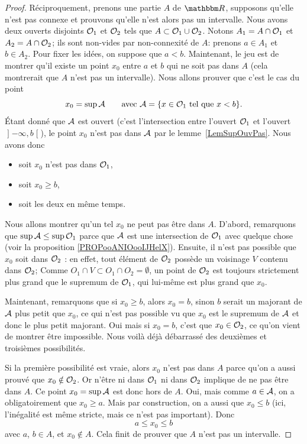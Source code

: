 \begin{proof}
    Réciproquement, prenons une partie $A$ de $\eR$, supposons qu'elle n'est pas connexe et prouvons qu'elle n'est alors pas un intervalle. Nous avons deux ouverts disjoints $\mathcal{O}_1$ et $\mathcal{O}_2$ tels que $A\subset \mathcal{O}_1\cup \mathcal{O}_2$. Notons \( A_1 = A \cap \mathcal{O}_1 \) et  \( A_2 = A \cap \mathcal{O}_2 \); ils sont non-vides par non-connexité de $A$: prenons $a\in A_1$ et $b\in A_2$. Pour fixer les idées, on suppose que $a<b$. Maintenant, le jeu est de montrer qu'il existe un point $x_0$ entre $a$ et $b$ qui ne soit pas dans $A$ (cela montrerait que $A$ n'est pas un intervalle). Nous allons prouver que c'est le cas du point
    \begin{equation}
      x_0=\sup \mathcal{A} \qquad \text{avec }\mathcal{A} = \{ x\in\mathcal{O}_1\text{ tel que } x<b \}.
    \end{equation}
    Étant donné que $\mathcal{A}$ est ouvert (c'est l'intersection entre l'ouvert $\mathcal{O}_1$ et l'ouvert $\mathopen] -\infty, b \mathclose[$), le point $x_0$ n'est pas dans $\mathcal{A}$ par le lemme~\ref{LemSupOuvPas}. Nous avons donc
    \begin{itemize}
        \item soit $x_0$ n'est pas dans $\mathcal{O}_1$,
        \item soit $x_0\geq b$,
        \item soit les deux en même temps.
    \end{itemize}
    Nous allons montrer qu'un tel $x_0$ ne peut pas être dans $A$. D'abord, remarquons que $\sup\mathcal{A}\leq\sup\mathcal{O}_1$ parce que $\mathcal{A}$ est une intersection de $\mathcal{O}_1$ avec quelque chose (voir la proposition \ref{PROPooANIOooIJHelX}). Ensuite, il n'est pas possible que $x_0$ soit dans $\mathcal{O}_2$ : en effet, tout élément de $\mathcal{O}_2$ possède un voisinage $V$ contenu dans $\mathcal{O}_2$; Comme $O_1 \cap V \subset O_1 \cap O_2 = \emptyset$, un point de $\mathcal{O}_2$ est toujours strictement plus grand que le supremum de $\mathcal{O}_1$, qui lui-même est plus grand que $x_0$.

    Maintenant, remarquons que si $x_0\geq b$, alors $x_0=b$, sinon $b$ serait un majorant de $\mathcal{A}$ plus petit que $x_0$, ce qui n'est pas possible vu que $x_0$ est le supremum de $\mathcal{A}$ et donc le plus petit majorant. Oui mais si $x_0=b$, c'est que $x_0\in\mathcal{O}_2$, ce qu'on vient de montrer être impossible. Nous voilà déjà débarrassé des deuxièmes et troisièmes possibilités.

    Si la première possibilité est vraie, alors $x_0$ n'est pas dans $A$ parce qu'on a aussi prouvé que $x_0\notin\mathcal{O}_2$. Or n'être ni dans $\mathcal{O}_1$ ni dans $\mathcal{O}_2$ implique de ne pas être dans $A$. Ce point $x_0=\sup\mathcal{A}$ est donc hors de $A$. Oui, mais comme $a\in\mathcal{A}$, on a obligatoirement que $x_0\geq a$. Mais par construction, on a aussi que $x_0\leq b$ (ici, l'inégalité est même stricte, mais ce n'est pas important). Donc
    \[
      a\leq x_0\leq b
    \]
    avec $a$, $b\in A$, et $x_0\notin A$. Cela finit de prouver que $A$ n'est pas un intervalle.
\end{proof}


